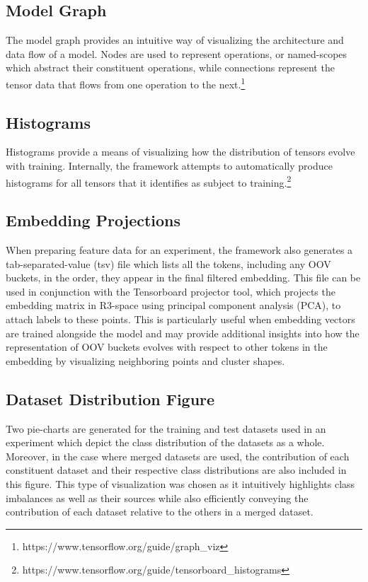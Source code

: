 \documentclass[../../fyp.tex]{subfiles}
\begin{document}
\subsection{Model Graph}
The model graph provides an intuitive way of visualizing the architecture and data flow of a model. Nodes are used to represent operations, or named-scopes which abstract their constituent operations, while connections represent the tensor data that flows from one operation to the next.\footnote{https://www.tensorflow.org/guide/graph\_viz} 

\subsection{Histograms}
Histograms provide a means of visualizing how the distribution of tensors evolve with training. Internally, the framework attempts to automatically produce histograms for all tensors that it identifies as subject to training.\footnote{https://www.tensorflow.org/guide/tensorboard\_histograms}

\subsection{Embedding Projections}
When preparing feature data for an experiment, the framework also generates a tab-separated-value (tsv) file which lists all the tokens, including any OOV buckets, in the order, they appear in the final filtered embedding. This file can be used in conjunction with the Tensorboard projector tool, which projects the embedding matrix in R3-space using principal component analysis (PCA), to attach labels to these points. This is particularly useful when embedding vectors are trained alongside the model and may provide additional insights into how the representation of OOV buckets evolves with respect to other tokens in the embedding by visualizing neighboring points and cluster shapes.

\subsection{Dataset Distribution Figure}
Two pie-charts are generated for the training and test datasets used in an experiment which depict the class distribution of the datasets as a whole. Moreover, in the case where merged datasets are used, the contribution of each constituent dataset and their respective class distributions are also included in this figure. This type of visualization was chosen as it intuitively highlights class imbalances as well as their sources while also efficiently conveying the contribution of each dataset relative to the others in a merged dataset.
\end{document}
